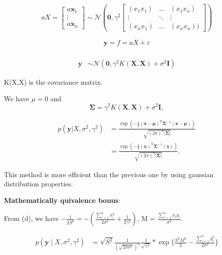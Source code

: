\documentclass[11pt]{article}
\newcommand{\mbf}[1]{{\boldsymbol{\mathbf{#1}}}}
\renewcommand{\bm}{\mbf}
\begin{document}
\begin{enumerate}
\begin{enumerate}[label=(\alph*)]
$$
aX=\left[\begin{array}{c}
    a\mathbf{x}_{1} \\
    \vdots \\
    a\mathbf{x}_{n} 
\end{array}\right] \sim \mathcal{N}\left(\mathbf{0},\gamma^2\left[\begin{array}{ccc}
( x_1 x_1 ) & \ldots &(x_1 x_n ) \\
\vdots & \ddots & \vdots \\
( x_n x_1 ) & \ldots & ( x_n x_n ))
\end{array}\right]\right)
$$



$$
\begin{aligned}
\mathbf{y} = f = aX + \varepsilon \\
\end{aligned}
$$


$$
\begin{aligned}
\mathbf{y}
&\sim  \mathcal{N}\left(\mathbf{0}, \gamma^2 K(\mathbf{X}, \mathbf{X})+\sigma^2 \boldsymbol{I}\right)
\end{aligned}
$$

K(X,X) is the covariance matrix.


We have $\mu = 0$ and $$\boldsymbol{\Sigma} = \gamma^2 K(\mathbf{X}, \mathbf{X})+\sigma^2 \boldsymbol{I} ,$$

$$
\begin{aligned}
p(\bm{y} | X, \sigma^2, \gamma^2)&=\frac{\exp \left(-\frac{1}{2}(\mathbf{x}-\boldsymbol{\mu})^{\mathrm{T}} \boldsymbol{\Sigma}^{-1}(\mathbf{x}-\boldsymbol{\mu})\right)}{\sqrt{(2 \pi)^{n}|\mathbf{\Sigma}|}} \\
&= \frac{\exp \left(-\frac{1}{2}(\mathbf{x})^{\mathrm{T}} \boldsymbol{\Sigma}^{-1}(\mathbf{x})\right)}{\sqrt{(2 \pi)^{n}|\mathbf{\Sigma}|}}.
\end{aligned}
$$

This method is more efficient than the previous one by using gaussian distribution properties.

\textbf{Mathematically quivalence bonus}:

From (d), we have  $ -\frac{1}{2S^2}  =  -( \frac{\sum_{i=1}^{n}{x_i^2}}{2\sigma^2} + \frac{1}{2\gamma^2}) $, M = $\frac{\sum_{i=1}^{n} x_i y_i}{\sigma^2}$.


$$
\begin{aligned}
p(\mathbf{y} \mid X, \sigma^2, \gamma^2)
&= \sqrt{ S^2} \frac{1}{(\sqrt{2\pi \sigma^2})^n} \frac{1}{\sqrt{\gamma^2}} * \exp \{\frac{S^2M^2}{2} - \frac{\sum_{i=1}^{n}{y_i^2}}{2\sigma^2}\} \\
\end{aligned}
$$


\end{enumerate}
\end{enumerate}
\end{document}
